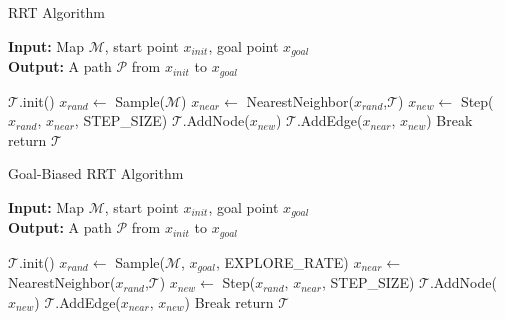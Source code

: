 \documentclass[a4paper]{article}
\begin{document}
  
\begin{algorithm}[htbp]
\caption{RRT Algorithm}
\hspace*{0.02in} {\bf Input:} %
Map $\mathcal{M}$, start point $x_{init}$, goal point $x_{goal}$\\
\hspace*{0.02in} {\bf Output:} %
A path $\mathcal{P}$ from $x_{init}$ to $x_{goal}$
\begin{algorithmic}[1]
  \State $\mathcal{T}$.init()
    \State $x_{rand} \leftarrow$ Sample($\mathcal{M}$)
    \State $x_{near} \leftarrow$ NearestNeighbor($x_{rand}$,$ \mathcal{T}$)
    \State $x_{new} \leftarrow$ Step($x_{rand}$, $x_{near}$, STEP\_SIZE)
      \State $\mathcal{T}$.AddNode($x_{new}$)
      \State $\mathcal{T}$.AddEdge($x_{near}$, $x_{new}$)
    \EndIf
      \State Break
    \EndIf
  \EndFor
  \State return $\mathcal{T}$
\end{algorithmic}
\end{algorithm}

\begin{algorithm}[htbp]
\caption{Goal-Biased RRT Algorithm}
\hspace*{0.02in} {\bf Input:} %
Map $\mathcal{M}$, start point $x_{init}$, goal point $x_{goal}$\\
\hspace*{0.02in} {\bf Output:} %
A path $\mathcal{P}$ from $x_{init}$ to $x_{goal}$
\begin{algorithmic}[1]
  \State $\mathcal{T}$.init()
    \State $x_{rand} \leftarrow$ Sample($\mathcal{M}$, $x_{goal}$, EXPLORE\_RATE)
    \State $x_{near} \leftarrow$ NearestNeighbor($x_{rand}$,$ \mathcal{T}$)
    \State $x_{new} \leftarrow$ Step($x_{rand}$, $x_{near}$, STEP\_SIZE)
      \State $\mathcal{T}$.AddNode($x_{new}$)
      \State $\mathcal{T}$.AddEdge($x_{near}$, $x_{new}$)
    \EndIf
      \State Break
    \EndIf
  \EndFor
  \State return $\mathcal{T}$
\end{algorithmic}
\end{algorithm}
\end{document}

